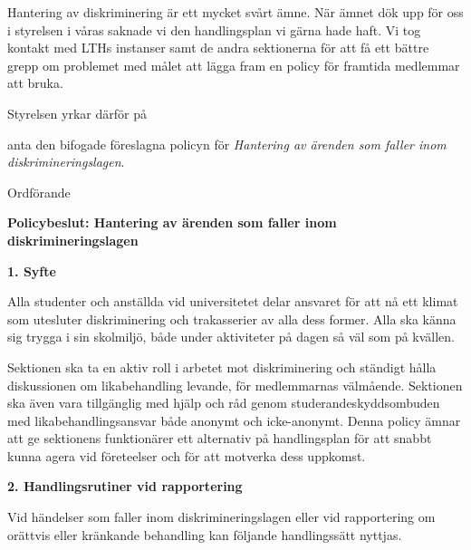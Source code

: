 \documentclass[../_main/handlingar.tex]{subfiles}
\begin{document}

Hantering av diskriminering är ett mycket svårt ämne. När ämnet dök upp för oss i styrelsen i våras saknade vi den handlingsplan vi gärna hade haft. 
Vi tog kontakt med LTHs instanser samt de andra sektionerna för att få ett bättre grepp om problemet med målet att lägga fram en policy för framtida medlemmar att bruka. 

Styrelsen yrkar därför på

\begin{attsatser}
    \att anta den bifogade föreslagna policyn för \textit{Hantering av ärenden som faller inom diskrimineringslagen}.
\end{attsatser}

\begin{signatures}{1}
    \ist
    \signature{\ordf}{Ordförande}
\end{signatures}

\newpage
{\Large \textbf{Policybeslut: Hantering av ärenden som faller inom diskrimineringslagen}}

{\large \textbf{1. Syfte}}

Alla studenter och anställda vid universitetet delar ansvaret för att nå ett klimat som utesluter diskriminering och trakasserier av alla dess former. Alla ska känna sig trygga i sin skolmiljö, både under aktiviteter på dagen så väl som på kvällen.

Sektionen ska ta en aktiv roll i arbetet mot diskriminering och ständigt hålla diskussionen om likabehandling levande, för medlemmarnas välmående. Sektionen ska även vara tillgänglig med hjälp och råd genom studerandeskyddsombuden med likabehandlingsansvar både anonymt och icke-anonymt. Denna policy ämnar att ge sektionens funktionärer ett alternativ på handlingsplan för att snabbt kunna agera vid företeelser och för att motverka dess uppkomst.

{\large \textbf{2. Handlingsrutiner vid rapportering}}

Vid händelser som faller inom diskrimineringslagen eller vid rapportering om orättvis eller kränkande behandling kan följande handlingssätt nyttjas.
\end{document}
